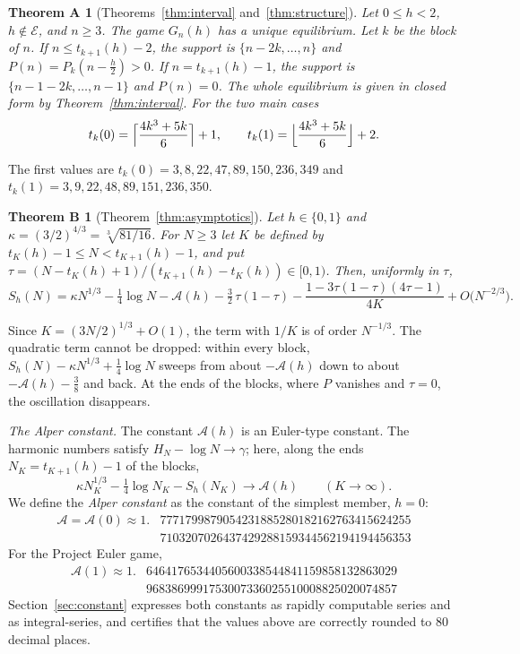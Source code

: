 \documentclass[11pt]{article}
\newtheorem*{theoremA}{Theorem A}
\newtheorem*{theoremB}{Theorem B}
\theoremstyle{definition}
\theoremstyle{remark}
\newcommand{\Alp}{\mathcal{A}}
\begin{document}
\begin{theoremA}[Theorems~\ref{thm:interval} and~\ref{thm:structure}]
Let $0\le h<2$, $h\notin\mathcal E$, and $n\ge3$. The game $G_n(h)$ has a
unique equilibrium. Let $k$ be the block of $n$. If $n\le t_{k+1}(h)-2$,
the support is $\{n-2k,\dots,n\}$ and $P(n)=P_k(n-\frac h2)>0$. If
$n=t_{k+1}(h)-1$, the support is $\{n-1-2k,\dots,n-1\}$ and $P(n)=0$.
The whole equilibrium is given in closed form by
Theorem~\ref{thm:interval}. For the two main cases
\[
t_k(0)=\Bigl\lceil\frac{4k^3+5k}{6}\Bigr\rceil+1,\qquad
t_k(1)=\Bigl\lfloor\frac{4k^3+5k}{6}\Bigr\rfloor+2 .
\]
\end{theoremA}

The first values are $t_k(0)=3,8,22,47,89,150,236,349$ and
$t_k(1)=3,9,22,48,89,151,236,350$.

\begin{theoremB}[Theorem~\ref{thm:asymptotics}]
Let $h\in\{0,1\}$ and $\kappa=(3/2)^{4/3}=\sqrt[3]{81/16}$. For $N\ge3$ let
$K$ be defined by $t_K(h)-1\le N<t_{K+1}(h)-1$, and put
$\tau=(N-t_K(h)+1)/(t_{K+1}(h)-t_K(h))\in[0,1)$. Then, uniformly in $\tau$,
\[
S_h(N)=\kappa N^{1/3}-\tfrac14\log N-\Alp(h)-\tfrac32\,\tau(1-\tau)
-\frac{1-3\tau(1-\tau)(4\tau-1)}{4K}+O\bigl(N^{-2/3}\bigr).
\]
\end{theoremB}

Since $K=(3N/2)^{1/3}+O(1)$, the term with $1/K$ is of order $N^{-1/3}$.
The quadratic term cannot be dropped: within every block,
$S_h(N)-\kappa N^{1/3}+\frac14\log N$ sweeps from about $-\Alp(h)$ down to
about $-\Alp(h)-\frac38$ and back. At the ends of the blocks, where $P$
vanishes and $\tau=0$, the oscillation disappears.

\emph{The Alper constant.} The constant $\Alp(h)$ is an Euler-type
constant. The harmonic numbers satisfy
$H_N-\log N\to\gamma$; here, along the ends $N_K=t_{K+1}(h)-1$ of the
blocks,
\[
\kappa N_K^{1/3}-\tfrac14\log N_K-S_h(N_K)\longrightarrow\Alp(h)
\qquad(K\to\infty).
\]
We define the \emph{Alper constant} as the constant of the simplest
member, $h=0$:
\[
\begin{aligned}
\Alp=\Alp(0)\approx1.&7771799879054231885280182162763415624255\\
&7103207026437429288159344562194194456353
\end{aligned}
\]
For the Project Euler game,
\[
\begin{aligned}
\Alp(1)\approx1.&6464176534405600338544841159858132863029\\
&9683869991753007336025510008825020074857
\end{aligned}
\]
Section~\ref{sec:constant} expresses both constants as rapidly computable
series and as integral-series, and certifies that the values above are
correctly rounded to $80$ decimal places.
\end{document}
